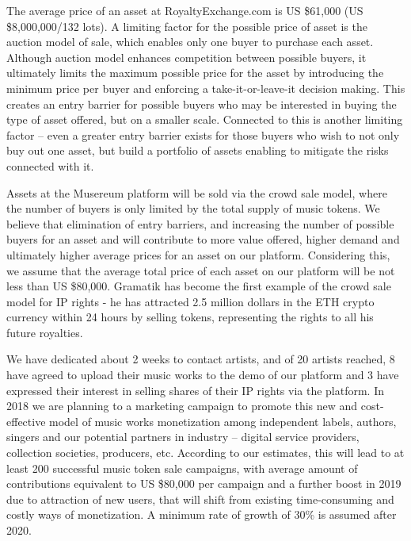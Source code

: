 \documentclass[12pt]{report}
\begin{document}
\vfill\null\pagebreak

The average price of an asset at RoyaltyExchange.com is US \$61,000 (US \$8,000,000/132 lots). A limiting factor for the possible price of asset is the auction model of sale, which enables only one buyer to purchase each asset. Although auction model enhances competition between possible buyers, it ultimately limits the maximum possible price for the asset by introducing the minimum price per buyer and enforcing a take-it-or-leave-it decision making. This creates an entry barrier for possible buyers who may be interested in buying the type of asset offered, but on a smaller scale. Connected to this is another limiting factor – even a greater entry barrier exists for those buyers who wish to not only buy out one asset, but build a portfolio of assets enabling to mitigate the risks connected with it.

Assets at the Musereum platform will be sold via the crowd sale model, where the number of buyers is only limited by the total supply of music tokens. We believe that elimination of entry barriers, and increasing the number of possible buyers for an asset and will contribute to more value offered, higher demand and ultimately higher average prices for an asset on our platform. Considering this, we assume that the average total price of each asset on our platform will be not less than US \$80,000. Gramatik has become the first example of the crowd sale model for IP rights - he has attracted 2.5 million dollars in the ETH crypto currency within 24 hours by selling tokens, representing the rights to all his future royalties.

We have dedicated about 2 weeks to contact artists, and of 20 artists reached, 8 have agreed to upload their music works to the demo of our platform and 3 have expressed their interest in selling shares of their IP rights via the platform. In 2018 we are planning to a marketing campaign to promote this new and cost-effective model of music works monetization among independent labels, authors, singers and our potential partners in industry – digital service providers, collection societies, producers, etc. According to our estimates, this will lead to at least 200 successful music token sale campaigns, with average amount of contributions equivalent to US \$80,000 per campaign and a further boost in 2019 due to attraction of new users, that will shift from existing time-consuming and costly ways of monetization. A minimum rate of growth of 30\% is assumed after 2020. 
\end{document}

